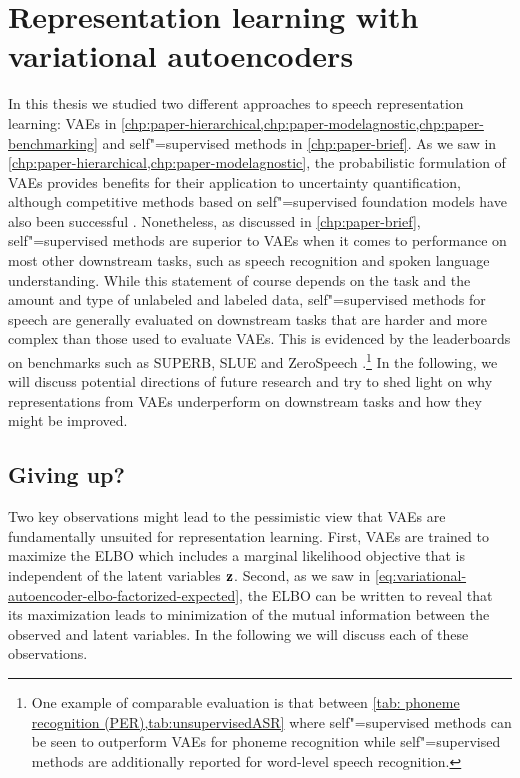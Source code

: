 \section{Representation learning with variational autoencoders}\label{sec_discussion:representation-learning-with-vaes}
%
In this thesis we studied two different approaches to speech representation learning: VAEs in \cref{chp:paper-hierarchical,chp:paper-modelagnostic,chp:paper-benchmarking} and self"=supervised methods in \cref{chp:paper-brief}. 
As we saw in \cref{chp:paper-hierarchical,chp:paper-modelagnostic}, the probabilistic formulation of VAEs provides benefits for their application to uncertainty quantification, although competitive methods based on self"=supervised foundation models have also been successful \parencite{xiao_we_2021,hendrycks_using_2019,bergman_classificationbased_2020}. 
Nonetheless, as discussed in \cref{chp:paper-brief}, self"=supervised methods are superior to VAEs when it comes to performance on most other downstream tasks, such as speech recognition and spoken language understanding. 
While this statement of course depends on the task and the amount and type of unlabeled and labeled data, self"=supervised methods for speech are generally evaluated on downstream tasks that are harder and more complex than those used to evaluate VAEs. This is evidenced by the leaderboards on benchmarks such as SUPERB, SLUE and ZeroSpeech \parencite{yang_superb_2021,shon_slue_2021,dunbar_zero_2021}.\footnote{One example of comparable evaluation is that between \cref{tab: phoneme recognition (PER),tab:unsupervisedASR} where self"=supervised methods can be seen to outperform VAEs for phoneme recognition while self"=supervised methods are additionally reported for word-level speech recognition.} 
In the following, we will discuss potential directions of future research and try to shed light on why representations from VAEs underperform on downstream tasks and how they might be improved.


\subsection{Giving up?}

Two key observations might lead to the pessimistic view that VAEs are fundamentally unsuited for representation learning. 
First, VAEs are trained to maximize the ELBO which includes a marginal likelihood objective that is independent of the latent variables ${\mathbf{z}}$. Second, as we saw in \cref{eq:variational-autoencoder-elbo-factorized-expected}, the ELBO can be written to reveal that its maximization leads to minimization of the mutual information between the observed and latent variables. In the following we will discuss each of these observations.

